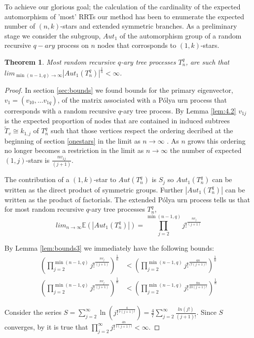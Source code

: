 \documentclass[12pt]{article} %
\newtheorem{thm}{Theorem}[section]
\theoremstyle{definition}
\begin{document}
To achieve our glorious goal; the calculation of the cardinality of the expected automorphism of 'most' RRTs our method has been to enumerate the expected number of $(n,k)$-stars and extended symmetric branches.  As a preliminary stage we consider the subgroup, $Aut_{1}$ of the automorphism group of a random recursive $q-ary$ process on $n$ nodes that corrosponds to $(1,k)$-stars.  

\begin{thm}
 Most random recursive $q$-ary tree processes $T_{n}^{q}$, are such that $lim_{\min(n-1,q)\rightarrow\infty} |Aut_{1}(T_{n}^{q})|^{\frac{1}{n}} < \infty$. 
\end{thm}
  
\begin{proof}
 In section \ref{sec:bounds} we found bounds for the primary eigenvector, $v_{1} = (v_{10},\dots v_{1q})$, of the matrix associated with a P\'{o}lya urn process that corresponds with a random recursive $q$-ary tree process.  By Lemma \ref{lem:4.2} $v_{1j}$ is the expected proportion of nodes that are contained in induced subtrees $\tilde{T}_{v} \cong k_{1,j}$ of $T_{n}^{q}$ such that those vertices respect the ordering decribed at the beginning of section \ref{onestars} in the limit as $n \rightarrow\infty$ .  As $n$ grows this ordering no longer becomes a restriction in the limit as $n \rightarrow\infty$ the number of expected $(1,j)$-stars is $\frac{nv_{1j}}{(j+1)}$.  
 
 The contribution of a $(1,k)$-star to $Aut(T_{n}^{q})$ is $S_{j}$ so $Aut_{1}(T_{n}^{q})$ can be written as the direct product of symmetric groups. Further $|Aut_{1}(T_{n}^{q})|$ can be written as the product of factorials.  The extended P\'{o}lya urn process tells us that for most random recursive $q$-ary tree processes $T_{n}^{q}$,  
 \[lim_{n \rightarrow\infty} \mathbb{E}(|Aut_{1}(T_{n}^{q})|) = \prod_{j=2}^{\min(n-1, q)} j!^{\frac{nv_{j}}{(j+1)}}\]
 
 By Lemma \ref{lem:bounds3} we immediately have the following bounds:
 \begin{align}
  \left( \prod_{j=2}^{\min(n-1, q)} j!^{\frac{nv_{j}}{(j+1)}}\right)^{\frac{1}{n}} &< \left(\prod_{j=2}^{\min(n-1, q)} j!^{\frac{4n}{(7(j+1)!}}\right)^{\frac{1}{n}} \\
  \left(\prod_{j=2}^{\min(n-1, q)} j!^{\frac{nv_{j}}{(j+1)}}\right)^{\frac{1}{n}} &< \left(\prod_{j=2}^{\min(n-1, q)} j!^{\frac{8n}{23(j+1)!}}\right)^{\frac{1}{n}}
 \end{align}
 
 Consider the series $S  = \sum_{j=2}^{\infty} \ln\left(j!^{\frac{4}{7(j+1)!}}\right) = \frac{4}{7}\sum_{j=2}^{\infty} \frac{ln(j!)}{(j+1)!}$.  Since $S$ converges, by \cite{JonesandSinger} it is true that $\prod_{j=2}^{\infty} j!^{\frac{4n}{7(j+1)!}} < \infty$.  
 
\end{proof}
\end{document}
